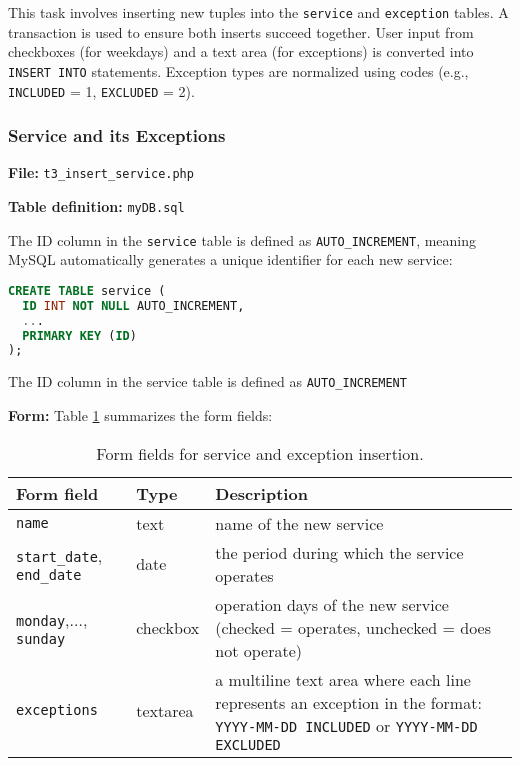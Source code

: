 \documentclass[a4paper, 12pt]{article}
\begin{document}
This task involves inserting new tuples into the \texttt{service} and \texttt{exception} tables. A transaction is used to ensure both inserts succeed together. User input from checkboxes (for weekdays) and a text area (for exceptions) is converted into \texttt{INSERT INTO} statements. Exception types are normalized using codes (e.g., \texttt{INCLUDED} = 1, \texttt{EXCLUDED} = 2).

\subsubsection{Service and its Exceptions}

\textbf{File:} \texttt{t3\_insert\_service.php}

\textbf{Table definition:} \texttt{myDB.sql}

The ID column in the \texttt{service} table is defined as \texttt{AUTO\_INCREMENT}, meaning MySQL automatically generates a unique identifier for each new service:

    \begin{lstlisting}[language=SQL]
CREATE TABLE service (
  ID INT NOT NULL AUTO_INCREMENT,
  ...
  PRIMARY KEY (ID)
);
    \end{lstlisting}


 The ID column in the service table is defined as \texttt{AUTO\_INCREMENT}

\textbf{Form:} Table \ref{tab:p3-t3-add-service} summarizes the form fields:

\begin{table}[H]
    \centering
    \footnotesize
    \caption{Form fields for service and exception insertion.}
    \label{tab:p3-t3-add-service}
    \begin{tabular}{llp{10cm}}
        \toprule
        \textbf{Form field} & \textbf{Type} & \textbf{Description} \\
        \midrule
        \texttt{name}                             & text      & name of the new service \\
        \texttt{start\_date}, \texttt{end\_date}  & date      & the period during which the service operates \\
        \texttt{monday},..., \texttt{sunday}      & checkbox  & operation days of the new service (checked = operates, unchecked = does not operate) \\
        \texttt{exceptions}                        & textarea  & a multiline text area where each line represents an exception in the format: \texttt{YYYY-MM-DD INCLUDED} or \texttt{YYYY-MM-DD EXCLUDED} \\
        \bottomrule
    \end{tabular}
\end{table}
\end{document}
